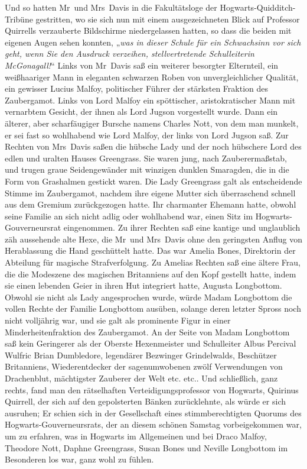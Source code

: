 {Und so hatten Mr~und Mrs~Davis in die Fakultätsloge der Hogwarts-Quidditch-Tribüne gestritten, wo sie sich nun mit einem ausgezeichneten Blick auf Professor Quirrells verzauberte Bildschirme niedergelassen hatten, so dass die beiden mit eigenen Augen sehen konnten, „\emph{was in dieser Schule für ein Schwachsinn vor sich geht, wenn Sie den Ausdruck verzeihen, stellvertretende Schulleiterin McGonagall!}“ Links von Mr~Davis saß ein weiterer besorgter Elternteil, ein weißhaariger Mann in eleganten schwarzen Roben von unvergleichlicher Qualität, ein gewisser Lucius Malfoy, politischer Führer der stärksten Fraktion des Zaubergamot. Links von Lord Malfoy ein spöttischer, aristokratischer Mann mit vernarbtem Gesicht, der ihnen als Lord Jugson vorgestellt wurde. Dann ein älterer, aber scharfäugiger Bursche namens Charles Nott, von dem man munkelt, er sei fast so wohlhabend wie Lord Malfoy, der links von Lord Jugson saß. Zur Rechten von Mrs~Davis saßen die hübsche Lady und der noch hübschere Lord des edlen und uralten Hauses Greengrass. Sie waren jung, nach Zauberermaßstab, und trugen graue Seidengewänder mit winzigen dunklen Smaragden, die in die Form von Grashalmen gestickt waren. Die Lady Greengrass galt als entscheidende Stimme im Zaubergamot, nachdem ihre eigene Mutter sich überraschend schnell aus dem Gremium zurückgezogen hatte. Ihr charmanter Ehemann hatte, obwohl seine Familie an sich nicht adlig oder wohlhabend war, einen Sitz im Hogwarts-Gouverneursrat eingenommen. Zu ihrer Rechten saß eine kantige und unglaublich zäh aussehende alte Hexe, die Mr~und Mrs~Davis ohne den geringsten Anflug von Herablassung die Hand geschüttelt hatte. Das war Amelia Bones, Direktorin der Abteilung für magische Strafverfolgung. Zu Amelias Rechten saß eine ältere Frau, die die Modeszene des magischen Britanniens auf den Kopf gestellt hatte, indem sie einen lebenden Geier in ihren Hut integriert hatte, Augusta Longbottom. Obwohl sie nicht als Lady angesprochen wurde, würde Madam Longbottom die vollen Rechte der Familie Longbottom ausüben, solange deren letzter Spross noch nicht volljährig war, und sie galt als prominente Figur in einer Minderheitenfraktion des Zaubergamot. An der Seite von Madam Longbottom saß kein Geringerer als der Oberste Hexenmeister und Schulleiter Albus Percival Wulfric Brian Dumbledore, legendärer Bezwinger Grindelwalds, Beschützer Britanniens, Wiederentdecker der sagenumwobenen zwölf Verwendungen von Drachenblut, mächtigster Zauberer der Welt etc. etc.. Und schließlich, ganz rechts, fand man den rätselhaften Verteidigungsprofessor von Hogwarts, Quirinus Quirrell, der sich auf den gepolsterten Bänken zurücklehnte, als würde er sich ausruhen; Er schien sich in der Gesellschaft eines stimmberechtigten Quorums des Hogwarts-Gouverneursrats, der an diesem schönen Samstag vorbeigekommen war, um zu erfahren, was in Hogwarts im Allgemeinen und bei Draco Malfoy, Theodore Nott, Daphne Greengrass, Susan Bones und Neville Longbottom im Besonderen los war, ganz wohl zu fühlen.

}
